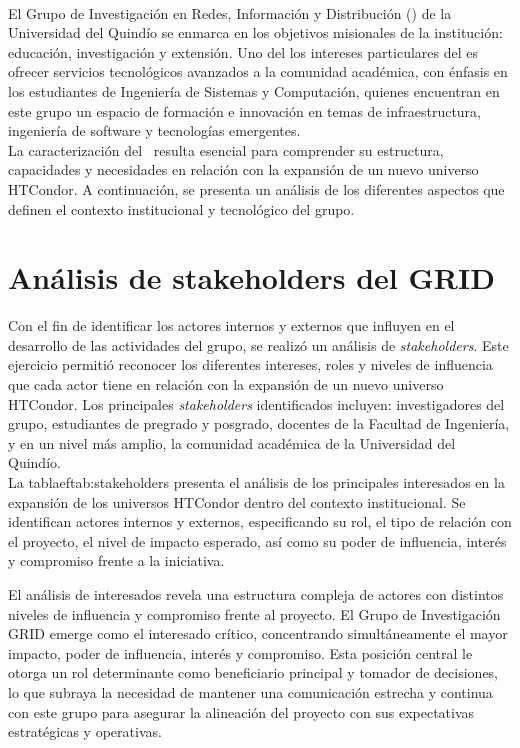 \label{cap:caracterizacionGRID}
\mbox{}\\
\noindent
El Grupo de Investigación en Redes, Información y Distribución (\GRID) de la Universidad del Quindío se enmarca en los objetivos misionales de la institución: educación, investigación y extensión. Uno del los intereses particulares del \GRID es ofrecer servicios tecnológicos avanzados a la comunidad académica, con énfasis en los estudiantes de Ingeniería de Sistemas y Computación, quienes encuentran en este grupo un espacio de formación e innovación en temas de infraestructura, ingeniería de software y tecnologías emergentes.\\
La caracterización del \GRID\ resulta esencial para comprender su estructura, capacidades y necesidades en relación con la expansión de un nuevo universo HTCondor. A continuación, se presenta un análisis de los diferentes aspectos que definen el contexto institucional y tecnológico del grupo.

\section{Análisis de stakeholders del GRID}
\noindent
Con el fin de identificar los actores internos y externos que influyen en el desarrollo de las actividades del grupo, se realizó un análisis de \textit{stakeholders}. Este ejercicio permitió reconocer los diferentes intereses, roles y niveles de influencia que cada actor tiene en relación con la expansión de un nuevo universo HTCondor. Los principales \textit{stakeholders} identificados incluyen: investigadores del grupo, estudiantes de pregrado y posgrado, docentes de la Facultad de Ingeniería, y en un nivel más amplio, la comunidad académica de la Universidad del Quindío.
\\
\noindent
La tablaef{tab:stakeholders} presenta el análisis de los principales interesados en la expansión de los universos HTCondor dentro del contexto institucional. Se identifican actores internos y externos, especificando su rol, el tipo de relación con el proyecto, el nivel de impacto esperado, así como su poder de influencia, interés y compromiso frente a la iniciativa.

El análisis de interesados revela una estructura compleja de actores con distintos niveles de influencia y compromiso frente al proyecto. El Grupo de Investigación GRID emerge como el interesado crítico, concentrando simultáneamente el mayor impacto, poder de influencia, interés y compromiso. Esta posición central le otorga un rol determinante como beneficiario principal y tomador de decisiones, lo que subraya la necesidad de mantener una comunicación estrecha y continua con este grupo para asegurar la alineación del proyecto con sus expectativas estratégicas y operativas.

